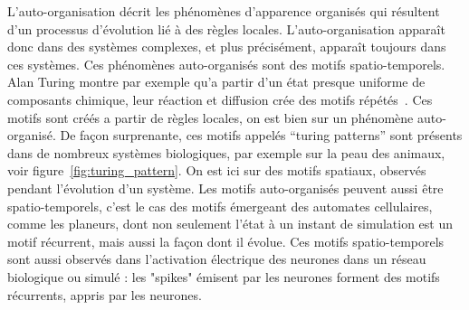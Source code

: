 L'auto-organisation décrit les phénomènes d'apparence organisés qui résultent d'un processus d'évolution lié à des règles locales. L'auto-organisation apparaît donc dans des systèmes complexes, et plus précisément, apparaît toujours dans ces systèmes. Ces phénomènes auto-organisés sont des motifs spatio-temporels. Alan Turing montre par exemple qu’a partir d’un état presque uniforme de composants chimique, leur réaction et diffusion crée des motifs répétés~\cite{turing52}. Ces motifs sont créés a partir de règles locales, on est bien sur un phénomène auto-organisé. De façon surprenante, ces motifs appelés “turing patterns” sont présents dans de nombreux systèmes biologiques, par exemple sur la peau des animaux, voir figure~\ref{fig:turing_pattern}. On est ici sur des motifs spatiaux, observés pendant l'évolution d'un système. Les motifs auto-organisés peuvent aussi être spatio-temporels, c'est le cas des motifs émergeant des automates cellulaires, comme les planeurs, dont non seulement l'état à un instant de simulation est un motif récurrent, mais aussi la façon dont il évolue. Ces motifs spatio-temporels sont aussi observés dans l'activation électrique des neurones dans un réseau biologique ou simulé : les "spikes" émisent par les neurones forment des motifs récurrents, appris par les neurones. 

